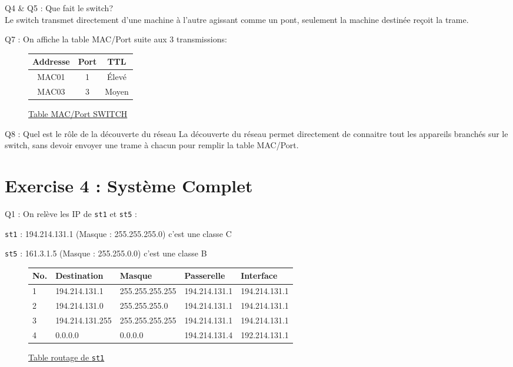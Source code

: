 \documentclass[11pt, openright]{book}
\begin{document}
\begin{dent}{Q4 \& Q5 :} Que fait le switch?\\
	Le switch transmet directement d'une machine à l'autre agissant comme un pont, seulement la machine destinée reçoit la trame.
	
\end{dent}


\begin{dent}{Q7 :} On affiche la table MAC/Port suite aux 3 transmissions:
	\begin{figure}[ht]
		\centering
		\begin{tabular}{|c|c|c|}
			\hline
			Addresse & Port & TTL   \\
			\hline
			MAC01    & 1    & Élevé \\
			\hline
			MAC03    & 3    & Moyen \\
			\hline
		\end{tabular}
		\caption{\ul{Table MAC/Port SWITCH}}
	\end{figure}
\end{dent}

\begin{dent}{Q8 :} Quel est le rôle de la découverte du réseau
	La découverte du réseau permet directement de connaitre tout les appareils branchés sur le switch, sans devoir envoyer une trame à chacun pour remplir la table MAC/Port.
\end{dent}

\newpage

\section{Exercise 4 : Système Complet}

\begin{dent}{Q1 :}
	On relève les IP de \texttt{st1} et \texttt{st5} :
	\begin{items}{-15pt}{-15pt}
		\item \texttt{st1} : 194.214.131.1 (Masque : 255.255.255.0) c'est une classe C
		\item \texttt{st5} : 161.3.1.5 (Masque : 255.255.0.0) c'est une classe B
	\end{items}
\end{dent}


\begin{figure}[ht!]
	\centering
	\begin{tabular}{|l|l|l|l|l|}
		\hline
		No. & Destination     & Masque          & Passerelle    & Interface     \\
		\hline
		1   & 194.214.131.1   & 255.255.255.255 & 194.214.131.1 & 194.214.131.1 \\
		\hline
		2   & 194.214.131.0   & 255.255.255.0   & 194.214.131.1 & 194.214.131.1 \\
		\hline
		3   & 194.214.131.255 & 255.255.255.255 & 194.214.131.1 & 194.214.131.1 \\
		\hline
		4   & 0.0.0.0         & 0.0.0.0         & 194.214.131.4 & 192.214.131.1 \\
		\hline
	\end{tabular}
	\caption{\ul{Table routage de \texttt{st1}}}
\end{figure}
\end{document}
